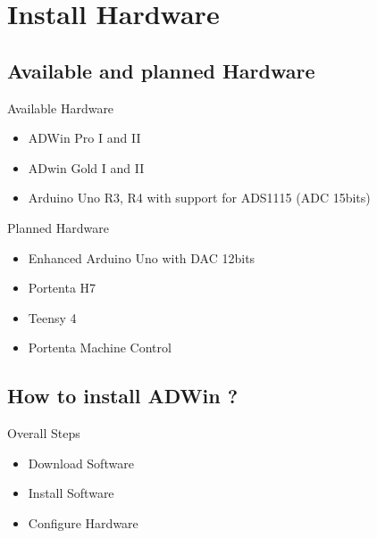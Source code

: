 \documentclass[a4paper,11pt]{beamer}
\begin{document}
\section{Install Hardware}
\subsection{Available and planned Hardware}
\begin{frame}[containsverbatim]

\begin{block}{Available Hardware}
    \begin{itemize}
        \item ADWin Pro I and II
        \item ADwin Gold I and II
        \item Arduino Uno R3, R4 with support for ADS1115 (ADC 15bits)
    \end{itemize}
\end{block}

\begin{alertblock}{Planned Hardware}
    \begin{itemize}
        \item Enhanced Arduino Uno with DAC 12bits
        \item Portenta H7
        \item Teensy 4
        \item Portenta Machine Control
    \end{itemize}
\end{alertblock}
\end{frame}

\subsection{How to install ADWin ?}
\begin{frame}[containsverbatim]
\begin{block}{Overall Steps}
    \begin{itemize}
        \item Download Software
        \item Install Software
        \item Configure Hardware
    \end{itemize}
\end{block}
\end{frame}
\end{document}
